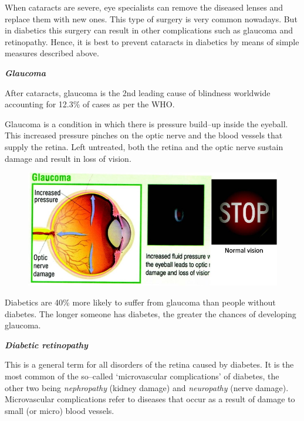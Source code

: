 When cataracts are severe, eye specialists can remove the diseased lenses and replace them with new ones. This type of surgery is very common nowadays. But in diabetics this surgery can result in other complications such as glaucoma and retinopathy. Hence, it is best to prevent cataracts in diabetics by means of simple measures described above.

\textbf{\textit{Glaucoma}}

After cataracts, glaucoma is the 2nd leading cause of blindness worldwide accounting for 12.3\% of cases as per the WHO.

Glaucoma is a condition in which there is pressure build–up inside the eyeball. This increased pressure pinches on the optic nerve and the blood vessels that supply the retina. Left untreated, both the retina and the optic nerve sustain damage and result in loss of vision.

\begin{figure}
\includegraphics{images/051.jpg}
\end{figure}

Diabetics are 40\% more likely to suffer from glaucoma than people without diabetes. The longer someone has diabetes, the greater the chances of developing glaucoma.


\textbf{\textit{Diabetic retinopathy}}

This is a general term for all disorders of the retina caused by diabetes. It is the most common of the so–called ‘microvascular complications’ of diabetes, the other two being \textit{nephropathy} (kidney damage) and \textit{neuropathy} (nerve damage). Microvascular complications refer to diseases that occur as a result of damage to small (or micro) blood vessels.

